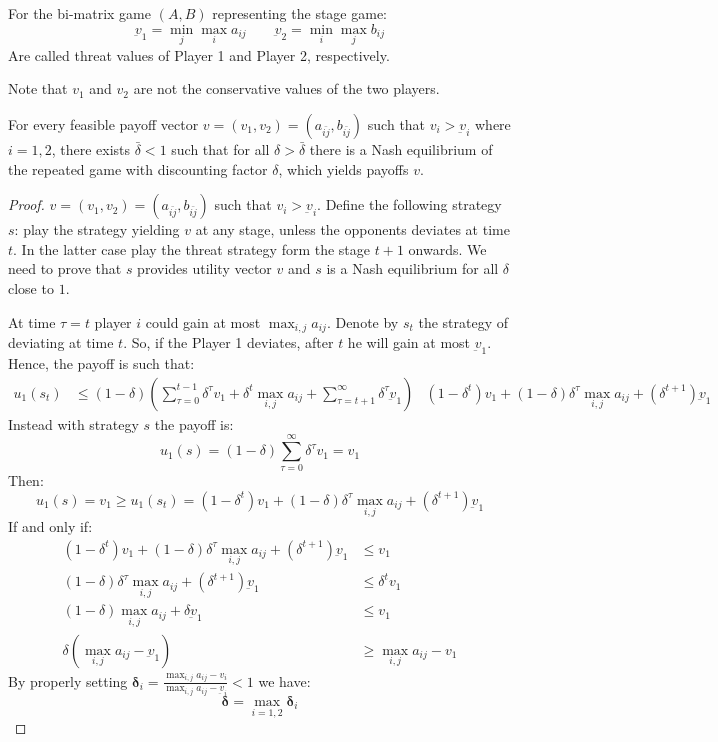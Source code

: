 \begin{definition}
    For the bi-matrix game $(A,B)$ representing the stage game: 
    \[\underbar{v}_1=\min_j\max_i a_{ij}\qquad \underbar{v}_2=\min_i\max_j b_{ij}\]
    Are called threat values of Player 1 and Player 2, respectively. 
\end{definition}
\noindent Note that $v_1$ and $v_2$ are not the conservative values of the two players. 
\begin{theorem}
    For every feasible payoff vector $v=(v_1,v_2)=(a_{\bar{ij}},b_{\bar{ij}})$ such that $v_i>\underbar{v}_i$ where $i=1,2$, there exists $\bar{\delta}<1$ such that for all $\delta>\bar{\delta}$ there is a Nash equilibrium of the repeated game with discounting factor $\delta$, which yields payoffs $v$. 
\end{theorem}
\begin{proof}
    $v=(v_1,v_2)=(a_{\bar{ij}},b_{\bar{ij}})$ such that $v_i>\underbar{v}_i$. 
    Define the following strategy $s$: play the strategy yielding $v$ at any stage, unless the opponents deviates at time $t$. 
    In the latter case play the threat strategy form the stage $t+1$ onwards. 
    We need to prove that $s$ provides utility vector $v$ and $s$ is a Nash equilibrium for all $\delta$ close to $1$. 

    At time $\tau=t$ player $i$ could gain at most $\max_{i,j}a_{ij}$. 
    Denote by $s_t$ the strategy of deviating at time $t$. 
    So, if the Player 1 deviates, after $t$ he will gain at most $\underbar{v}_1$. 
    Hence, the payoff is such that: 
    \begin{align*}
        u_1(s_t)    &\leq(1-\delta)\left(\sum_{\tau=0}^{t-1}\delta^\tau v_1+\delta^t\max_{i,j}a_{ij}+\sum_{\tau=t+1}^{\infty}\delta^\tau\underbar{v}_1\right) 
                    &(1-\delta^t)v_1+(1-\delta)\delta^\tau\max_{i,j}a_{ij}+(\delta^{t+1})\underbar{v}_1
    \end{align*}
    Instead with strategy $s$ the payoff is: 
    \[u_1(s)=(1-\delta)\sum_{\tau=0}^{\infty}\delta^\tau v_1=v_1\]
    Then: 
    \[u_1(s)=v_1\geq u_1(s_t)=(1-\delta^t)v_1+(1-\delta)\delta^\tau\max_{i,j}a_{ij}+(\delta^{t+1})\underbar{v}_1\]
    If and only if: 
    \begin{align*}
        (1-\delta^t)v_1+(1-\delta)\delta^\tau\max_{i,j}a_{ij}+(\delta^{t+1})\underbar{v}_1  &\leq v_1 \\
        (1-\delta)\delta^\tau\max_{i,j}a_{ij}+(\delta^{t+1})\underbar{v}_1                  &\leq \delta^t v_1 \\
        (1-\delta)\max_{i,j}a_{ij}+\delta\underbar{v}_1                                     &\leq  v_1 \\
        \delta(\max_{i,j}a_{ij}-\underbar{v}_1)                                             &\geq  \max_{i,j}a_{ij}-v_1
    \end{align*}
    By properly setting $\boldsymbol{\delta}_{i}=\frac{\max_{i,j}a_{ij}-v_i}{\max_{i,j}a_{ij}-\underbar{v}_{i}}<1$ we have: 
    \[\boldsymbol{\delta}=\max_{i=1,2}\boldsymbol{\delta}_i\]
\end{proof}

